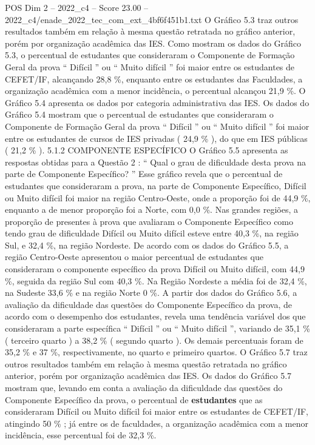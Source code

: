\begin{textsample}{POS Dim 2 – 2022\_c4 – Score 23.00 – 2022\_c4/enade\_2022\_tec\_com\_ext\_4bf6f451b1.txt}
O Gráfico 5.3 traz outros resultados também em relação à mesma questão retratada no gráfico anterior, porém por organização acadêmica das IES.
Como mostram os dados do Gráfico 5.3, o percentual de estudantes que consideraram o Componente de Formação Geral da prova “ Difícil ” ou “ Muito difícil ” foi maior entre os estudantes de CEFET/IF, alcançando 28,8 \%, enquanto entre os estudantes das Faculdades, a organização acadêmica com a menor incidência, o percentual alcançou 21,9 \%.
O Gráfico 5.4 apresenta os dados por categoria administrativa das IES.
Os dados do Gráfico 5.4 mostram que o percentual de estudantes que consideraram o Componente de Formação Geral da prova “ Difícil ” ou “ Muito difícil ” foi maior entre os estudantes de cursos de IES privadas ( 24,9 \% ), do que em IES públicas ( 21,2 \% ). 5.1.2 COMPONENTE ESPECÍFICO O Gráfico 5.5 apresenta as respostas obtidas para a Questão 2 : “ Qual o grau de dificuldade desta prova na parte de Componente Específico? ” Esse gráfico revela que o percentual de estudantes que consideraram a prova, na parte de Componente Específico, Difícil ou Muito difícil foi maior na região Centro-Oeste, onde a proporção foi de 44,9 \%, enquanto a de menor proporção foi a Norte, com 0,0 \%.
Nas grandes regiões, a proporção de presentes à prova que avaliaram o Componente Específico como tendo grau de dificuldade Difícil ou Muito difícil esteve entre 40,3 \%, na região Sul, e 32,4 \%, na região Nordeste.
De acordo com os dados do Gráfico 5.5, a região Centro-Oeste apresentou o maior percentual de estudantes que consideraram o componente específico da prova Difícil ou Muito difícil, com 44,9 \%, seguida da região Sul com 40,3 \%.
Na Região Nordeste a média foi de 32,4 \%, na Sudeste 33,6 \% e na região Norte 0 \%.
A partir dos dados do Gráfico 5.6, a avaliação da dificuldade das questões do Componente Específico da prova, de acordo com o desempenho dos estudantes, revela uma tendência variável dos que consideraram a parte específica “ Difícil ” ou “ Muito difícil ”, variando de 35,1 \% ( terceiro quarto ) a 38,2 \% ( segundo quarto ).
Os demais percentuais foram de 35,2 \% e 37 \%, respectivamente, no quarto e primeiro quartos.
O Gráfico 5.7 traz outros resultados também em relação à mesma questão retratada no gráfico anterior, porém por organização acadêmica das IES.
Os dados do Gráfico 5.7 mostram que, levando em conta a avaliação da dificuldade das questões do Componente Específico da prova, o percentual de \textbf{estudantes} que as consideraram Difícil ou Muito difícil foi maior entre os estudantes de CEFET/IF, atingindo 50 \% ; já entre os de faculdades, a organização acadêmica com a menor incidência, esse percentual foi de 32,3 \%.

\end{textsample}
